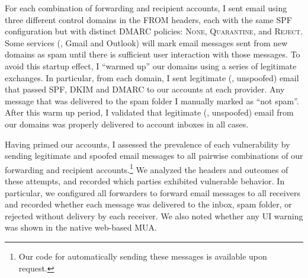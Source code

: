 For each combination of forwarding and recipient accounts, I sent
email using three different control domains in the FROM headers, each
with the same SPF configuration but with distinct DMARC policies:
\textsc{None}, \textsc{Quarantine}, and \textsc{Reject}.
%
Some services (\eg, Gmail and Outlook) will mark email messages sent
from new domains as spam until there is sufficient user interaction
with those messages.  To avoid this startup effect, I ``warmed up''
our domains using a series of legitimate exchanges.  In particular,
from each domain, I sent legitimate (\ie, unspoofed) email that
passed SPF, DKIM and DMARC to our accounts at each provider.  Any
message that was delivered to the spam folder I manually marked as
``not spam''.  After this warm up period, I validated that legitimate
(\ie, unspoofed) email from our domains was properly delivered to
account inboxes in all cases.

Having primed our accounts, I assessed the prevalence of each vulnerability by
sending legitimate and spoofed email messages to all
pairwise combinations of our forwarding and recipient accounts.\footnote{Our code for automatically sending these messages is available upon request.}  We
analyzed the headers and outcomes of these attempts, and recorded
which parties exhibited vulnerable behavior.  In particular, we
configured all forwarders to forward email messages to all receivers
and recorded whether each message was delivered to the inbox, spam
folder, or rejected without delivery by each receiver.  We also noted
whether any UI warning was shown in the native web-based MUA. 







